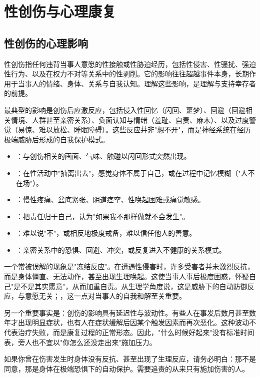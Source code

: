 \section{性创伤与心理康复}
\subsection{性创伤的心理影响}

性创伤指任何违背当事人意愿的性接触或性胁迫经历，包括性侵害、性骚扰、强迫性行为、以及在权力不对等关系中的性剥削。它的影响往往超越事件本身，长期作用于当事人的情绪、身体、关系与自我认知。理解这些影响，是理解与支持幸存者的前提。

最典型的影响是创伤后应激反应，包括侵入性回忆（闪回、噩梦）、回避（回避相关情境、人群甚至亲密关系）、负面认知与情绪（羞耻、自责、麻木）、以及过度警觉（易惊、难以放松、睡眠障碍）。这些反应并非"想不开"，而是神经系统在经历极端威胁后形成的自我保护模式。

\begin{itemize}
  \item {}：与创伤相关的画面、气味、触碰以闪回形式突然出现。
  \item {}：在性活动中"抽离出去"，感觉身体不属于自己，或在过程中记忆模糊（"人不在场"）。
  \item {}：慢性疼痛、盆底紧张、阴道痉挛、性唤起困难或痛觉敏感。
  \item {}：把责任归于自己，认为"如果我不那样做就不会发生"。
  \item {}：难以说"不"，或相反地极度戒备，难以信任他人的善意。
  \item {}：亲密关系中的恐惧、回避、冲突，或反复进入不健康的关系模式。
\end{itemize}

一个常被误解的现象是"冻结反应"。在遭遇性侵害时，许多受害者并未激烈反抗，而是身体僵直、无法动作，甚至出现生理唤起。这使当事人事后极度困惑，怀疑自己"是不是其实愿意"，从而加重自责。从生理学角度说，这是威胁下的自动防御反应，与意愿无关；，这一点对当事人的自我和解至关重要。

另一个重要事实是：创伤的影响具有延迟性与波动性。有些人在事发后数月甚至数年才出现明显症状，也有人在症状缓解后因某个触发因素而再次恶化。这种波动不代表治疗失败，而是康复过程的正常形态。因此，"什么时候好起来"没有标准时间表，旁人也不宜以"你怎么还没走出来"施加压力。

\begin{tcolorbox}[colback=pink!5!white,colframe=red!50!black,title=贴心小叮咛]
如果你曾在伤害发生时身体没有反抗、甚至出现了生理反应，请务必明白：那不是同意，那是身体在极端恐惧下的自动保护。需要追责的从来只有施加伤害的人。
\end{tcolorbox}
